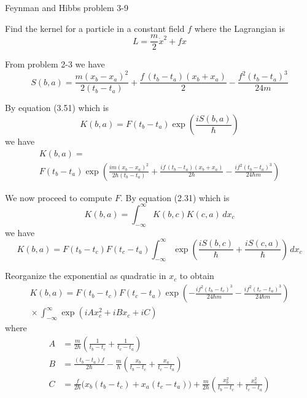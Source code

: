 \documentclass[12pt]{article}
\begin{document}
Feynman and Hibbs problem 3-9

\bigskip
Find the kernel for a particle in a constant field $f$
where the Lagrangian is
\begin{equation*}
L=\frac{m}{2}\dot x^2+fx
\end{equation*}

From problem 2-3 we have
\begin{equation*}
S(b,a)=\frac{m(x_b-x_a)^2}{2(t_b-t_a)}+\frac{f\,(t_b-t_a)(x_b+x_a)}{2}-\frac{f^2(t_b-t_a)^3}{24m}
\end{equation*}

By equation (3.51) which is
\begin{equation*}
K(b,a)=F(t_b-t_a)\exp\left(\frac{iS(b,a)}{\hbar}\right)
\end{equation*}
we have
\begin{multline*}
K(b,a)=
\\
F(t_b-t_a)\exp\left(
\frac{im(x_b-x_a)^2}{2\hbar(t_b-t_a)}
+\frac{if\,(t_b-t_a)(x_b+x_a)}{2\hbar}
-\frac{if^2(t_b-t_a)^3}{24\hbar m}
\right)
\tag{1}
\end{multline*}

We now proceed to compute $F$. By equation (2.31) which is
\begin{equation*}
K(b,a)=\int_{-\infty}^\infty K(b,c)K(c,a)\,dx_c
\end{equation*}
we have
\begin{equation*}
K(b,a)=F(t_b-t_c)F(t_c-t_a)\int_{-\infty}^\infty
\exp\left(\frac{iS(b,c)}{\hbar}+\frac{iS(c,a)}{\hbar}\right)
\,dx_c
\end{equation*}

Reorganize the exponential as quadratic in $x_c$ to obtain
\begin{multline*}
K(b,a)=F(t_b-t_c)F(t_c-t_a)
\exp\left(-\frac{if^2(t_b-t_c)^3}{24\hbar m}-\frac{if^2(t_c-t_a)^3}{24\hbar m}\right)
\\[1ex]
{}\times
\int_{-\infty}^\infty
\exp\left(iAx_c^2+iBx_c+iC\right)
\tag{2}
\end{multline*}
where
\begin{align*}
A&=\frac{m}{2\hbar}\left(\frac{1}{t_b-t_c}+\frac{1}{t_c-t_a}\right)
\tag{3}
\\
B&=\frac{(t_b-t_a)f}{2\hbar}-\frac{m}{\hbar}\left(\frac{x_b}{t_b-t_c}+\frac{x_a}{t_c-t_a}\right)
\tag{4}
\\
C&=\frac{f}{2\hbar}\big(x_b(t_b-t_c)+x_a(t_c-t_a)\big)+\frac{m}{2\hbar}
\left(\frac{x_b^2}{t_b-t_c}+\frac{x_a^2}{t_c-t_a}\right)
\tag{5}
\end{align*}
\end{document}

